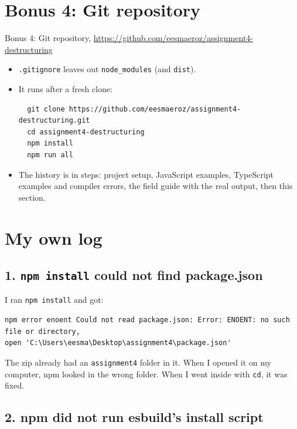 \documentclass[
  10pt,
]{article}
\begin{document}
\hypertarget{bonus-4-git-repository}{%
\section{Bonus 4: Git repository}\label{bonus-4-git-repository}}

Bonus 4: Git repository,
\url{https://github.com/eesmaeroz/assignment4-destructuring}

\begin{itemize}
\item
  \texttt{.\allowbreak{}gitignore} leaves out \texttt{node\_modules}
  (and \texttt{dist}).
\item
  It runs after a fresh clone:

  \begin{verbatim}
  git clone https://github.com/eesmaeroz/assignment4-destructuring.git
  cd assignment4-destructuring
  npm install
  npm run all
  \end{verbatim}
\item
  The history is in steps: project setup, JavaScript examples,
  TypeScript examples and compiler errors, the field guide with the real
  output, then this section.
\end{itemize}

\hypertarget{my-own-log}{%
\section{My own log}\label{my-own-log}}

\hypertarget{1-npm-install-could-not-find-packagejson}{%
\subsection{\texorpdfstring{1. \texttt{npm\ install} could not find
package.json}{1.  could not find package.json}}\label{1-npm-install-could-not-find-packagejson}}

I ran \texttt{npm\ install} and got:

\begin{verbatim}
npm error enoent Could not read package.json: Error: ENOENT: no such file or directory,
open 'C:\Users\eesma\Desktop\assignment4\package.json'
\end{verbatim}

The zip already had an \texttt{assignment4} folder in it. When I opened
it on my computer, npm looked in the wrong folder. When I went inside
with \texttt{cd}, it was fixed.

\hypertarget{2-npm-did-not-run-esbuilds-install-script}{%
\subsection{2. npm did not run esbuild's install
script}\label{2-npm-did-not-run-esbuilds-install-script}}
\end{document}
